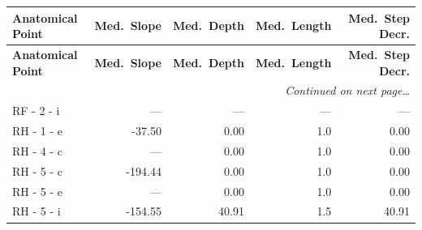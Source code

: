 \documentclass[a4paper,11pt]{article}
\begin{document}
\begin{small}
\begin{longtable}{p{4.5cm}rrrr}
\toprule
\textbf{Anatomical Point} &
\textbf{Med.\ Slope} &
\textbf{Med.\ Depth} &
\textbf{Med.\ Length} &
\textbf{Med.\ Step Decr.} \\
\midrule
\endfirsthead
\toprule
\textbf{Anatomical Point} &
\textbf{Med.\ Slope} &
\textbf{Med.\ Depth} &
\textbf{Med.\ Length} &
\textbf{Med.\ Step Decr.} \\
\midrule
\endhead
\midrule
\multicolumn{5}{r}{\small\emph{Continued on next page\ldots}} \\
\endfoot
\bottomrule
\endlastfoot
RF - 2 - i & --- & --- & --- & --- \\
RH - 1 - e & -37.50 & 0.00 & 1.0 & 0.00 \\
RH - 4 - c & --- & 0.00 & 1.0 & 0.00 \\
RH - 5 - c & -194.44 & 0.00 & 1.0 & 0.00 \\
RH - 5 - e & --- & 0.00 & 1.0 & 0.00 \\
RH - 5 - i & -154.55 & 40.91 & 1.5 & 40.91 \\
\end{longtable}
\end{small}
\end{document}
